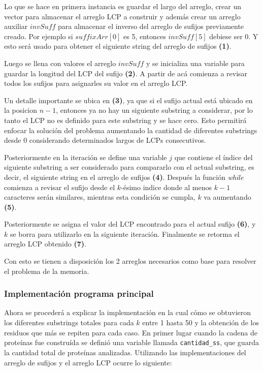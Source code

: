 Lo que se hace en primera instancia es guardar el largo del arreglo, crear un vector para almacenar el arreglo LCP a construir y además crear un arreglo auxiliar $invSuff$ para almacenar el inverso del arreglo de sufijos previamente creado. Por ejemplo si $suffixArr[0]$ es 5, entonces $invSuff[5]$ debiese ser 0. Y esto será usado para obtener el siguiente string del arreglo de sufijos \textbf{(1)}.

Luego se llena con valores el arreglo $invSuff$ y se inicializa una variable para guardar la longitud del LCP del sufijo \textbf{(2)}. A partir de acá comienza a revisar todos los sufijos para asignarles su valor en el arreglo LCP.

Un detalle importante se ubica en \textbf{(3)}, ya que si el sufijo actual está ubicado en la posicion $n-1$, entonces ya no hay un siguiente substring a considerar, por lo tanto el LCP no es definido para este substring y se hace cero. Esto permitirá enfocar la solución del problema aumentando la cantidad de diferentes substrings desde 0 considerando determinados largos de LCPs consecutivos.

Posteriormente en la iteración se define una variable $j$ que contiene el índice del siguiente substring a ser considerado para compararlo con el actual substring, es decir, el siguiente string en el arreglo de sufijos \textbf{(4)}. Después la función \textit{while} comienza a revisar el sufijo desde el $k$-ésimo indice donde al menos $k-1$ caracteres serán similares, mientras esta condición se cumpla, $k$ va aumentando \textbf{(5)}.

Posteriormente se asigna el valor del LCP encontrado para el actual sufijo \textbf{(6)}, y $k$ se borra para utilizarlo en la siguiente iteración. Finalmente se retorma el arreglo LCP obtenido \textbf{(7)}.

Con esto se tienen a disposición los 2 arreglos necesarios como base para resolver el problema de la memoria.

\subsubsection{Implementación programa principal}

Ahora se procederá a explicar la implementación en la cual cómo se obtuvieron los diferentes substrings totales para cada $k$ entre 1 hasta 50 y la obtención de los residuos que más se repiten para cada caso. En primer lugar cuando la cadena de proteínas fue construída se definió una variable llamada \texttt{cantidad\_ss}, que guarda la cantidad total de proteínas analizadas. Utilizando las implementaciones del arreglo de sufijos y el arreglo LCP ocurre lo siguiente:

